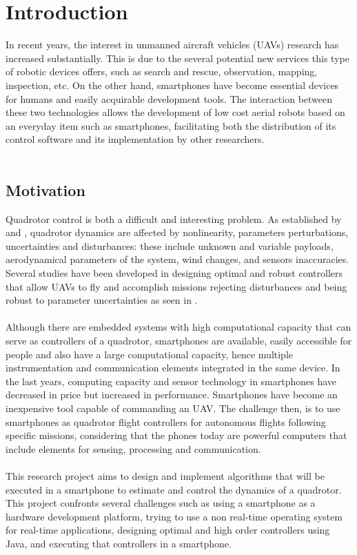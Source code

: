 \chapter{Introduction} \label{ch:introduction}
In recent years, the interest in unmanned aircraft vehicles (UAVs) research has increased substantially. This is due to the several potential new services this type of robotic devices offers, such as search and rescue, observation, mapping, inspection, etc. On the other hand, smartphones have become essential devices for humans and easily acquirable development tools. The interaction between these two technologies allows the development of low cost aerial robots based on an everyday item such as smartphones, facilitating both the distribution of its control software and its implementation by other researchers.
\\\\
\section{Motivation}
Quadrotor control is both a difficult and interesting problem. As established by \cite{Liu2015} and \cite{Lopez2015}, quadrotor dynamics are affected by nonlinearity, parameters perturbations, uncertainties and disturbances: these include unknown and variable payloads, aerodynamical parameters of the system, wind changes, and sensors inaccuracies. Several studies have been developed in designing optimal and robust controllers that allow UAVs to fly and accomplish missions rejecting disturbances and being robust to parameter uncertainties as seen in \cite{Jung2014, Kohno2014, Shang2016, Salazar2014}.\\\\
Although there are embedded systems with high computational capacity that can serve as controllers of a quadrotor, smartphones are available, easily accessible for people and also have a large computational capacity, hence multiple instrumentation and communication elements integrated in the same device. In the last years, computing capacity and sensor technology in smartphones have decreased in price but increased in performance. Smartphones have become an inexpensive tool capable of commanding an UAV. The challenge then, is to use smartphones as quadrotor flight controllers for autonomous flights following specific missions, considering that the phones today are powerful computers that include elements for sensing, processing and communication.
\\\\
This research project aims to design and implement algorithms that will be executed in a smartphone to estimate and control the dynamics of a quadrotor. This project confronts several challenges such as using a smartphone as a hardware development platform, trying to use a non real-time operating system for real-time applications, designing optimal and high order controllers using Java, and executing that controllers in a smartphone. 
\\\\
